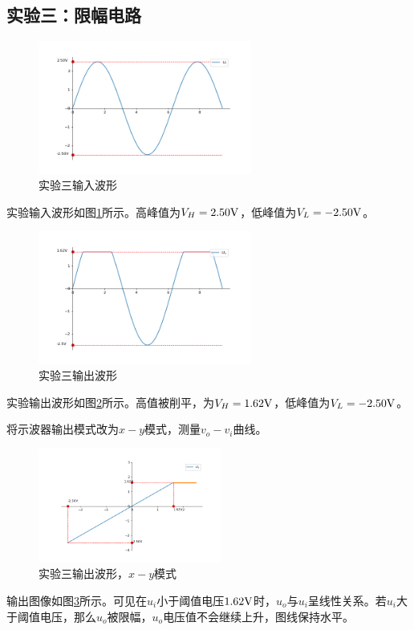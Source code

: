 \documentclass[a4paper,11pt,UTF8]{ctexart}
\begin{document}
	\subsection{实验三：限幅电路}
	\begin{figure}[H]
		\centering
		\includegraphics[width=7cm]{Ui.png}
		\caption{实验三输入波形}
		\label{fig:Exp3i}
	\end{figure}
	实验输入波形如图\ref{fig:Exp3i}所示。高峰值为$V_H=2.50\mathrm{V}$，低峰值为$V_L=-2.50\mathrm{V}$。
	\begin{figure}[H]
		\centering
		\includegraphics[width=7cm]{U5.png}
		\caption{实验三输出波形}
		\label{fig:Exp3o}
	\end{figure}
	实验输出波形如图\ref{fig:Exp3o}所示。高值被削平，为$V_H=1.62\mathrm{V}$，低峰值为$V_L=-2.50\mathrm{V}$。

	\par 将示波器输出模式改为$x - y$模式，测量$v_o - v_i$曲线。
	\begin{figure}[H]
		\centering
		\includegraphics[width=6cm]{U6.png}
		\caption{实验三输出波形，$x - y$模式}
		\label{fig:Exp3oxy}
	\end{figure}
	输出图像如图\ref{fig:Exp3oxy}所示。可见在$u_i$小于阈值电压$1.62\mathrm{V}$时，$u_o$与$u_i$呈线性关系。若$u_i$大于阈值电压，那么$u_o$被限幅，$u_o$电压值不会继续上升，图线保持水平。
\end{document}
